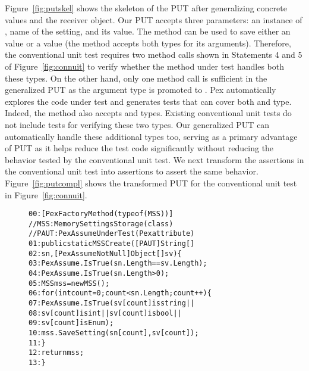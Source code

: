 Figure~\ref{fig:putskel} shows the skeleton of the PUT after generalizing concrete values and the receiver object. Our PUT accepts three parameters: an instance of , name of the setting, and its value. The  method can be used to save either an  value or a  value (the method accepts both types for its arguments). Therefore, the conventional unit test requires two method calls shown in Statements 4 and 5 of Figure~\ref{fig:connuit} to verify whether the method under test handles both these types. On the other hand, only one method call is sufficient in the generalized PUT as the argument type is promoted to . Pex automatically explores the code under test and generates tests that can cover both  and  type. Indeed, the  method also accepts  and  types. Existing conventional unit tests do not include tests for verifying these two types. Our generalized PUT can automatically handle these additional types too, serving as a primary advantage of PUT as it helps reduce the test code significantly without reducing the behavior tested by the conventional unit test. We next transform the assertions in the conventional unit test into  assertions to assert the same behavior. Figure~\ref{fig:putcompl} shows the transformed PUT for the conventional unit test in Figure~\ref{fig:connuit}.

\begin{figure}[t]
\begin{CodeOut}
\begin{alltt}
00:[PexFactoryMethod(typeof(MSS))]
\hspace*{0.3in}//MSS: MemorySettingsStorage (class)
\hspace*{0.3in}//PAUT: PexAssumeUnderTest	(Pex attribute)
01:public static MSS Create([PAUT]String[] 
02:\hspace*{0.3in}sn, [PexAssumeNotNull]Object[] sv) \{
03:\hspace*{0.2in}PexAssume.IsTrue(sn.Length == sv.Length);
04:\hspace*{0.2in}PexAssume.IsTrue(sn.Length > 0);
05:\hspace*{0.2in}MSS mss = new MSS();
06:\hspace*{0.2in}for (int count = 0; count < sn.Length; count++) \{
07:\hspace*{0.3in}PexAssume.IsTrue(sv[count] is string ||
08:\hspace*{0.4in}sv[count] is int || sv[count] is bool || 
09:\hspace*{0.4in}sv[count] is Enum);
10:\hspace*{0.3in}mss.SaveSetting(sn[count], sv[count]);
11:\hspace*{0.2in}\}
12:\hspace*{0.2in}return mss;            
13:\}
\end{alltt}
\end{CodeOut}
\end{figure}

